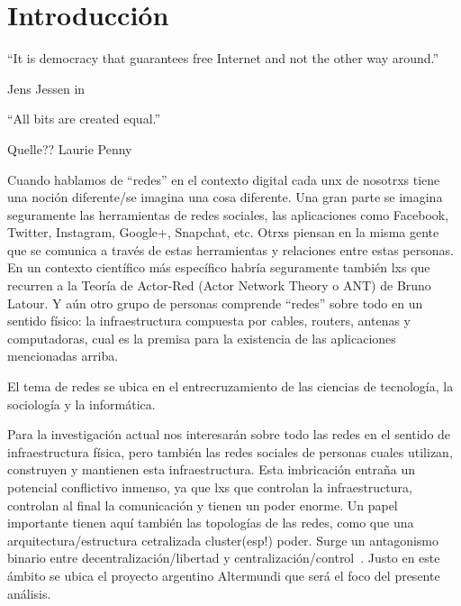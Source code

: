 \section{Introducción}

\epigraph{``It is democracy that guarantees free Internet and not the other way around.''}{Jens Jessen in~\autocite{Rieder2012}}
\epigraph{``All bits are created equal.''}{Quelle?? Laurie Penny~\autocite[69]{Penny2014}}


Cuando hablamos de ``redes'' en el contexto digital cada unx de nosotrxs tiene una noción diferente/se imagina una cosa diferente.
Una gran parte se imagina seguramente las herramientas de redes sociales, las aplicaciones como Facebook, Twitter, Instagram, Google+, Snapchat, etc.
Otrxs piensan en la misma gente que se comunica a través de estas herramientas y relaciones entre estas personas.
En un contexto científico más específico habría seguramente también lxs que recurren a la Teoría de Actor-Red (Actor Network Theory o ANT) de Bruno Latour.
Y aún otro grupo de personas comprende ``redes'' sobre todo en un sentido físico: la infraestructura compuesta por cables, routers, antenas y computadoras, cual es la premisa para la existencia de las aplicaciones mencionadas arriba.


El tema de redes se ubica en el entrecruzamiento de las ciencias de tecnología, la sociología y la informática.

\begin{comment}
por qué es importante/interesante?
	\item Erläutern Sie kurz, in welchem Themenbereich Ihre Arbeit angesiedelt ist. Wo werden Sie einen Beitrag leisten?
	\item Das Ziel sollte es sein, den groben Kontext Ihrer Arbeit darzustellen.

Política digital <-- Gabriella Coleman heranziehen

\end{comment}

Para la investigación actual nos interesarán sobre todo las redes en el sentido de infraestructura física, pero también las redes sociales de personas cuales utilizan, construyen y mantienen esta infraestructura.
Esta imbricación entraña un potencial conflictivo inmenso, ya que lxs que controlan la infraestructura, controlan al final la comunicación y tienen un poder enorme.
Un papel importante tienen aquí también las topologías de las redes, como que una arquitectura/estructura cetralizada cluster(esp!) poder.
Surge un antagonismo binario entre decentralización/libertad y centralización/control~\autocite{FiTre2015}.
Justo en este ámbito se ubica el proyecto argentino Altermundi que será el foco del presente análisis.

